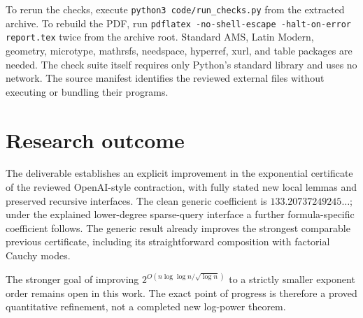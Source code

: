 \documentclass[11pt,letterpaper]{article}
\theoremstyle{definition}\newtheorem{definition}[theorem]{Definition}
\theoremstyle{remark}\newtheorem{remark}[theorem]{Remark}
\newcommand{\newconstant}{133.20737249245\ldots}
\begin{document}
To rerun the checks, execute \texttt{python3 code/run\_checks.py}
from the extracted archive. To rebuild the PDF, run
\texttt{pdflatex -no-shell-escape -halt-on-error report.tex} twice
from the archive root. Standard AMS, Latin Modern, geometry,
microtype, mathrsfs, needspace, hyperref, xurl, and table packages are needed. The
check suite itself requires only Python's standard library and
uses no network. The source manifest identifies the reviewed
external files without executing or bundling their programs.

\section{Research outcome}
The deliverable establishes an explicit improvement in the exponential
certificate of the reviewed OpenAI-style contraction, with fully stated
new local lemmas and preserved recursive interfaces. The clean generic
coefficient is $\newconstant$; under the explained lower-degree
sparse-query interface a further formula-specific coefficient follows.
The generic result already improves the strongest comparable previous
certificate, including its straightforward composition with factorial
Cauchy modes.

The stronger goal of improving
$2^{O(n\log\log n/\sqrt{\log n})}$ to a strictly smaller
exponent order remains open in this work. The exact point of progress
is therefore a proved quantitative refinement, not a completed new
log-power theorem.
\end{document}
